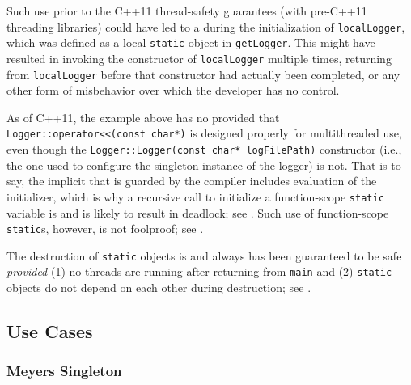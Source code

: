 Such use prior to the C++11 thread-safety guarantees (with pre-C++11 threading libraries) could
have led to a  during the initialization of
\lstinline!localLogger!, which was defined as a local \lstinline!static!
object in \lstinline!getLogger!.   This  might have resulted in
invoking the constructor of \lstinline!localLogger! multiple times, returning from
\lstinline!localLogger! \pagebreak%
 before that constructor had actually been completed, or
any other form of misbehavior over which the developer has no control.

\noindent As of C++11, the example above has no  provided that \linebreak%
\lstinline!Logger::operator<<(const!~\lstinline!char*)! is designed properly
for multithreaded use, even though the
\lstinline!Logger::Logger(const!~\lstinline!char*!~\lstinline!logFilePath)!
constructor (i.e., the one used to configure the singleton instance of
the logger) is not. That is to say, the implicit 
that is guarded by the compiler includes evaluation of the
initializer, which is why a recursive call to initialize a
function-scope \lstinline!static! variable is  and is
likely to result in deadlock; see .
Such use of function-scope \lstinline!static!s, however, is not foolproof;
see .

The destruction of  \lstinline!static! objects is
and always has been guaranteed to be safe \emph{provided} (1) no threads
are running after returning from \lstinline!main! and (2)
 \lstinline!static! objects do not depend on each
other during destruction; see .

\subsection[Use Cases]{Use Cases}\label{use-cases-functionstatic}

\subsubsection[Meyers Singleton]{Meyers Singleton}\label{meyers-singleton}

